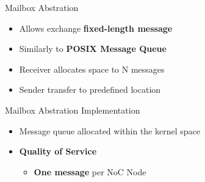 		\begin{frame}[fragile]{Mailbox Abstration}
			\begin{itemize}
				\item Allows exchange \textbf{fixed-length message}
				\item Similarly to \textbf{POSIX Message Queue}
				\item Receiver allocates space to N messages
				\item Sender transfer to predefined location
			\end{itemize}

	
		\end{frame}

		\begin{frame}[fragile]{Mailbox Abstration Implementation}
			\begin{itemize}
				\item Message queue allocated within the kernel space
				\item \textbf{Quality of Service}
				\begin{itemize}
					\item \textbf{One message} per NoC Node
				\end{itemize}
			\end{itemize}


			
		\end{frame}

